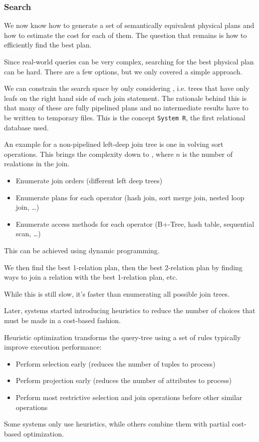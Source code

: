 \subsubsection{Search}
We now know how to generate a set of semantically equivalent physical plans and how to estimate the cost for each of them.
The question that remains is how to efficiently find the best plan.

Since real-world queries can be very complex, searching for the best physical plan can be hard.
There are a few options, but we only covered a simple approach.

We can constrain the search space by only considering , i.e. trees that have only leafs on the right hand side of each join statement.
The rationale behind this is that many of these are fully pipelined plans and no intermediate results have to be written to temporary files.
This is the concept \texttt{System R}, the first relational database used.

An example for a non-pipelined left-deep join tree is one in volving sort operations.
This brings the complexity down to , where $n$ is the number of realations in the join.

\begin{itemize}
    \item Enumerate join orders (different left deep trees)
    \item Enumerate plans for each operator (hash join, sort merge join, nested loop join, \dots)
    \item Enumerate access methods for each operator (B+-Tree, hash table, sequential scan, \dots)
\end{itemize}

This can be achieved using dynamic programming.

We then find the best 1-relation plan, then the best 2-relation plan by finding ways to join a relation with the best 1-relation plan, etc.

While this is still slow, it's faster than enumerating all possible join trees.

Later, systems started introducing heuristics to reduce the number of choices that must be made in a cost-based fashion.

Heuristic optimization transforms the query-tree using a set of rules typically improve execution performance:
\begin{itemize}
    \item Perform selection early (reduces the number of tuples to process)
    \item Perform projection early (reduces the number of attributes to process)
    \item Perform most restrictive selection and join operations before other similar operations
\end{itemize}

Some systems only use heuristics, while others combine them with partial cost-based optimization.
